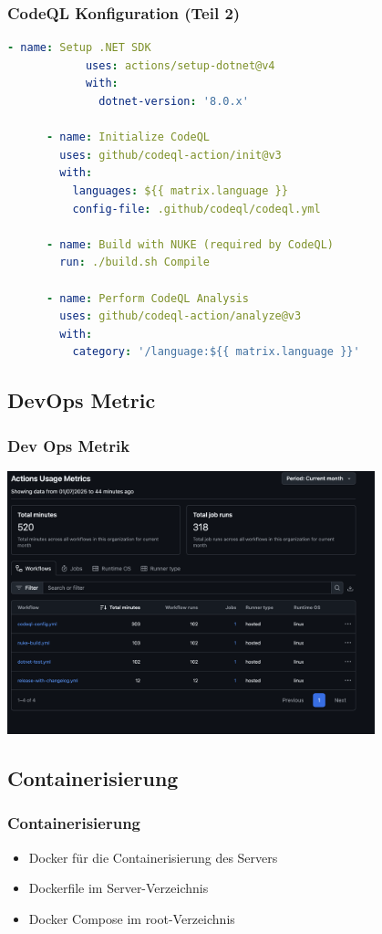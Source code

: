 \documentclass{beamer}
\begin{document}
\begin{frame}[fragile]
\frametitle{CodeQL Konfiguration (Teil 2)}
  \begin{lstlisting}[language=yaml, basicstyle=\ttfamily\tiny, breaklines=true]
      - name: Setup .NET SDK
            uses: actions/setup-dotnet@v4
            with:
              dotnet-version: '8.0.x'

      - name: Initialize CodeQL
        uses: github/codeql-action/init@v3
        with:
          languages: ${{ matrix.language }}
          config-file: .github/codeql/codeql.yml

      - name: Build with NUKE (required by CodeQL)
        run: ./build.sh Compile

      - name: Perform CodeQL Analysis
        uses: github/codeql-action/analyze@v3
        with:
          category: '/language:${{ matrix.language }}'
  \end{lstlisting}
\end{frame}

\subsection{DevOps Metric}
\begin{frame}
\frametitle{Dev Ops Metrik}
  \center
  \includegraphics[width=0.8\textwidth]{ActionsUsageMetric.png}
\end{frame}

\subsection{Containerisierung}
\begin{frame}
\frametitle{Containerisierung}
  \begin{itemize}
    \item Docker für die Containerisierung des Servers
    \item Dockerfile im Server-Verzeichnis
    \item Docker Compose im root-Verzeichnis
  \end{itemize}
\end{frame}
\end{document}
